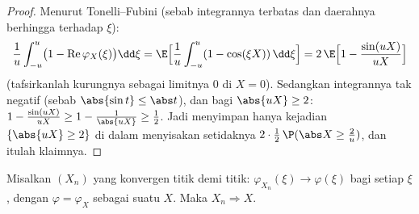 \begin{proof}
Menurut Tonelli--Fubini (sebab integrannya terbatas dan daerahnya berhingga terhadap
$\xi$):
\[
\frac1u\int_{-u}^u\bigl(1 -
\operatorname{Re}\varphi_X(\xi)\bigr)\dd\xi
= \E\Bigl[\frac1u\int_{-u}^u(1 - \cos(\xi X))\,\dd\xi\Bigr]
= 2\,\E\Bigl[1 - \frac{\sin(uX)}{uX}\Bigr]
\]
(tafsirkanlah kurungnya sebagai limitnya $0$ di $X = 0$). Sedangkan
integrannya tak negatif (sebab $\abs{\sin t} \leq \abs t$), dan
bagi $\abs{uX} \geq 2$: $1 - \frac{\sin(uX)}{uX} \geq 1 -
\frac1{\abs{uX}} \geq \frac12$. Jadi menyimpan hanya kejadian
$\{\abs{uX} \geq 2\}$ di dalam 
menyisakan setidaknya $2 \cdot \frac12\,\P(\abs X \geq \frac2u)$,
dan itulah klaimnya.
\end{proof}

\begin{theorem}
\label{thm:b3:clt:levy}
Misalkan $(X_n)$  yang  konvergen titik demi titik: $\varphi_{X_n}(\xi) \to
\varphi(\xi)$ bagi setiap $\xi$, dengan $\varphi =
\varphi_X$ sebagai  suatu  $X$. Maka $X_n \Rightarrow X$.
\end{theorem}

